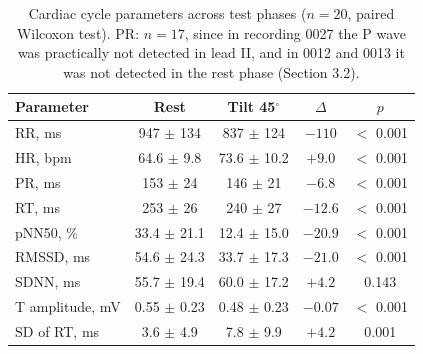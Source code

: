 \begin{table}[htbp]
\caption{Cardiac cycle parameters across test phases ($n = 20$, paired Wilcoxon test). PR: $n = 17$, since in recording 0027 the P wave was practically not detected in lead II, and in 0012 and 0013 it was not detected in the rest phase (Section 3.2).}
\label{tab:2}
\begin{center}\small
\begin{tabular}{|l|c|c|c|c|}
\hline
Parameter & Rest & Tilt 45$^{\circ}$ & $\Delta$ & $p$ \\
\hline
RR, ms & 947 $\pm$ 134 & 837 $\pm$ 124 & $-110$ & $<$ 0.001 \\
HR, bpm & 64.6 $\pm$ 9.8 & 73.6 $\pm$ 10.2 & $+9.0$ & $<$ 0.001 \\
PR, ms & 153 $\pm$ 24 & 146 $\pm$ 21 & $-6.8$ & $<$ 0.001 \\
RT, ms & 253 $\pm$ 26 & 240 $\pm$ 27 & $-12.6$ & $<$ 0.001 \\
pNN50, \% & 33.4 $\pm$ 21.1 & 12.4 $\pm$ 15.0 & $-20.9$ & $<$ 0.001 \\
RMSSD, ms & 54.6 $\pm$ 24.3 & 33.7 $\pm$ 17.3 & $-21.0$ & $<$ 0.001 \\
SDNN, ms & 55.7 $\pm$ 19.4 & 60.0 $\pm$ 17.2 & $+4.2$ & 0.143 \\
T amplitude, mV & 0.55 $\pm$ 0.23 & 0.48 $\pm$ 0.23 & $-0.07$ & $<$ 0.001 \\
SD of RT, ms & 3.6 $\pm$ 4.9 & 7.8 $\pm$ 9.9 & $+4.2$ & 0.001 \\
\hline
\end{tabular}
\end{center}\vs{-4mm}
\end{table}
